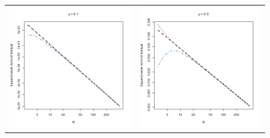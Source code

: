 \documentclass[letterpaper,12pt,oneside,final]{article}
\begin{document}
\begin{figure}
  \centering
  \begin{tabular}{cc}
    \includegraphics[scale = 0.45]{rho10.png} & \includegraphics[scale = 0.45]{rho50.png} \\

\end{tabular}
\end{figure}
\end{document}
